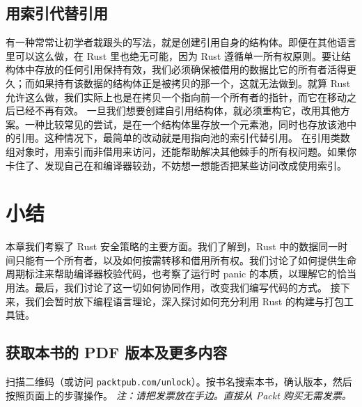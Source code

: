 \subsection{用索引代替引用}
\label{idx:idx_a166dc41}
有一种常常让初学者栽跟头的写法，就是创建引用自身的结构体。即便在其他语言里可以这么做，在 Rust 里也绝无可能，因为 Rust 遵循单一所有权原则。要让结构体中存放的任何引用保持有效，我们必须确保被借用的数据比它的所有者活得更久；而如果持有该数据的结构体正是被拷贝的那一个，这就无法做到。就算 Rust 允许这么做，我们实际上也是在拷贝一个指向前一个所有者的指针，而它在移动之后已经不再有效。
一旦我们想要创建自引用结构体，就必须重构它，改用其他方案。一种比较常见的尝试，是在一个结构体里存放一个元素池，同时也存放该池中的引用。这种情况下，最简单的改动就是用指向池的索引代替引用。
\label{idx:idx_acb137f1}
在引用类数组对象时，用索引而非借用来访问，还能帮助解决其他棘手的所有权问题。如果你卡住了、发现自己在和编译器较劲，不妨想一想能否把某些访问改成使用索引。
\section{小结}
本章我们考察了 Rust 安全策略的主要方面。我们了解到，Rust 中的数据同一时间只能有一个所有者，以及如何按需转移和借用所有权。我们讨论了如何提供生命周期标注来帮助编译器校验代码，也考察了运行时 panic 的本质，以理解它的恰当用法。最后，我们讨论了这一切如何协同作用，改变我们编写代码的方式。
接下来，我们会暂时放下编程语言理论，深入探讨如何充分利用 Rust 的构建与打包工具链。
\begin{samepage}
\subsection{获取本书的 PDF 版本及更多内容}
扫描二维码（或访问 \texttt{packtpub.\allowbreak{}com/\allowbreak{}unlock}）。按书名搜索本书，确认版本，然后按照页面上的步骤操作。
\emph{注：请把发票放在手边。直接从 Packt 购买无需发票。}
\end{samepage}
